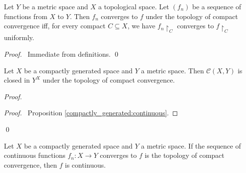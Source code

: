 \begin{thm}
  Let $Y$ be a metric space and $X$ a topological space. Let $(f_n)$ be a sequence of functions from $X$ to $Y$. Then $f_n$ converges to $f$ under the topology of compact convergence iff, for every compact $C \subseteq X$, we have $f_n \restriction_C$ converges to $f \restriction_C$ uniformly.
\end{thm}

\begin{proof}
  \pf\ Immediate from definitions. \qed
\end{proof}

\begin{thm}
  Let $X$ be a compactly generated space and $Y$ a metric space. Then $\mathcal{C}(X, Y)$ is closed in $Y^X$ under the topology of compact convergence.
\end{thm}

\begin{proof}
  \pf
  \qedstep
  \begin{proof}
    \pf\ Proposition \ref{compactly_generated:continuous}.
  \end{proof}
  \qed
\end{proof}

\begin{cor}
  Let $X$ be a compactly generated space and $Y$ a metric space. If the sequence of continuous functions $f_n : X \rightarrow Y$ converges to $f$ is the topology of compact convergence, then $f$ is continuous.
\end{cor}

